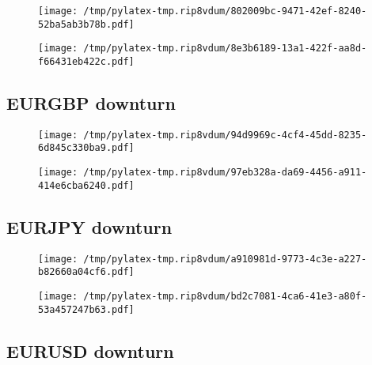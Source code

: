 \documentclass{article}%
\begin{document}
\begin{figure}[htbp]%
\centering%
\texttt{[image: /tmp/pylatex-tmp.rip8vdum/802009bc-9471-42ef-8240-52ba5ab3b78b.pdf]}%
\end{figure}

%


\begin{figure}[htbp]%
\centering%
\texttt{[image: /tmp/pylatex-tmp.rip8vdum/8e3b6189-13a1-422f-aa8d-f66431eb422c.pdf]}%
\end{figure}

%
\newpage %
\subsection{EURGBP downturn}%
\label{subsec:EURGBPdownturn}%


\begin{figure}[htbp]%
\centering%
\texttt{[image: /tmp/pylatex-tmp.rip8vdum/94d9969c-4cf4-45dd-8235-6d845c330ba9.pdf]}%
\end{figure}

%


\begin{figure}[htbp]%
\centering%
\texttt{[image: /tmp/pylatex-tmp.rip8vdum/97eb328a-da69-4456-a911-414e6cba6240.pdf]}%
\end{figure}

%
\newpage %
\subsection{EURJPY downturn}%
\label{subsec:EURJPYdownturn}%


\begin{figure}[htbp]%
\centering%
\texttt{[image: /tmp/pylatex-tmp.rip8vdum/a910981d-9773-4c3e-a227-b82660a04cf6.pdf]}%
\end{figure}

%


\begin{figure}[htbp]%
\centering%
\texttt{[image: /tmp/pylatex-tmp.rip8vdum/bd2c7081-4ca6-41e3-a80f-53a457247b63.pdf]}%
\end{figure}

%
\newpage %
\subsection{EURUSD downturn}%
\label{subsec:EURUSDdownturn}%
\end{document}

